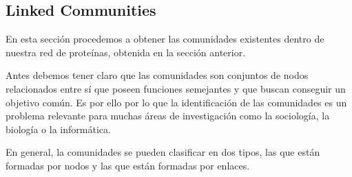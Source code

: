 \subsection{Linked Communities}
En esta sección procedemos a obtener las comunidades existentes dentro de nuestra red de proteínas, obtenida en la sección anterior.

Antes debemos tener claro que las comunidades son conjuntos de nodos relacionados entre sí que poseen funciones semejantes y que buscan conseguir un objetivo común. Es por ello por lo que la identificación de las comunidades es un problema relevante para muchas áreas de investigación como la sociología, la biología o la informática.

En general, la comunidades se pueden clasificar en dos tipos, las que están formadas por nodos y las que están formadas por enlaces.

